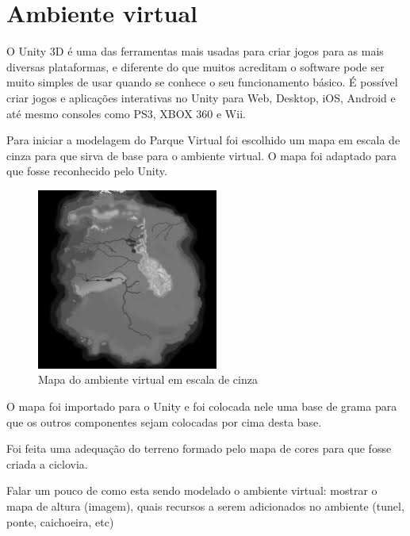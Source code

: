 \section{Ambiente virtual}

O Unity 3D é uma das ferramentas mais usadas para criar jogos para as mais diversas 
plataformas, e diferente do que muitos acreditam o software pode ser muito simples 
de usar quando se conhece o seu funcionamento básico. É possível criar jogos e 
aplicações interativas no Unity para Web, Desktop, iOS, Android e até mesmo 
consoles como PS3, XBOX 360 e Wii.

Para iniciar a modelagem do Parque Virtual foi escolhido um mapa em escala de 
cinza para que sirva de base para o ambiente virtual. O mapa foi adaptado para 
que fosse reconhecido pelo Unity.

\begin{figure}[htpb]
 \begin{center}
    \includegraphics[width=.40\textwidth]{figuras/mapa.jpeg}
 \end{center}
  \caption{Mapa do ambiente virtual em escala de cinza}
  \label{fig:core_concurrent}
\end{figure}

O mapa foi importado para o Unity e foi colocada nele uma base de grama para que
os outros componentes sejam colocadas por cima desta base.

Foi feita uma adequação do terreno formado pelo mapa de cores para que fosse criada
a ciclovia.
 

Falar um pouco de como esta sendo modelado o ambiente virtual: mostrar o mapa de altura (imagem), quais recursos a serem adicionados no ambiente (tunel, ponte, caichoeira, etc)
